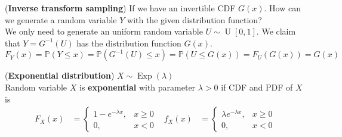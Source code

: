 \documentclass{huhtakm-template-book}
\newcommand{\prob}{\mathbb{P}}
\DeclareMathOperator{\U}{U}
\DeclareMathOperator{\Exp}{Exp}
\begin{document}
    \begin{eg} (\textbf{Inverse transform sampling})
        If we have an invertible CDF $G(x)$. How can we generate a random variable $Y$ with the given distribution function?\\
        We only need to generate an uniform random variable $U\sim\U[0,1]$. We claim that $Y=G^{-1}(U)$ has the distribution function $G(x)$.
        \begin{equation*}
            F_{Y}(x)=\prob(Y\leq x)=\prob(G^{-1}(U)\leq x)=\prob(U\leq G(x))=F_{U}(G(x))=G(x)
        \end{equation*}
    \end{eg}
    \begin{eg}(\textbf{Exponential distribution}) $X\sim\Exp(\lambda)$\\
        Random variable $X$ is \textbf{exponential} with parameter $\lambda>0$ if CDF and PDF of $X$ is
        \begin{align*}
            F_{X}(x)&=\begin{cases}
                1-e^{-\lambda x}, &x\geq 0\\
                0, &x<0
            \end{cases} & f_{X}(x)&=\begin{cases}
                \lambda e^{-\lambda x}, &x\geq 0\\
                0, &x<0
            \end{cases}
        \end{align*}
    \end{eg}
\end{document}
